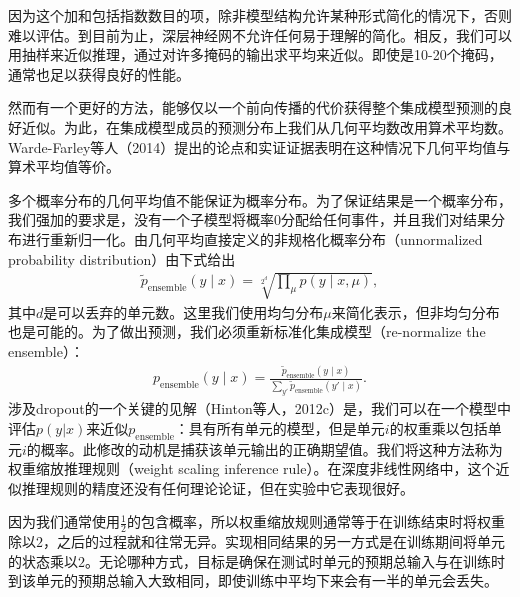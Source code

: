 因为这个加和包括指数数目的项，除非模型结构允许某种形式简化的情况下，否则难以评估。到目前为止，深层神经网不允许任何易于理解的简化。相反，我们可以用抽样来近似推理，通过对许多掩码的输出求平均来近似。即使是10-20个掩码，通常也足以获得良好的性能。

然而有一个更好的方法，能够仅以一个前向传播的代价获得整个集成模型预测的良好近似。为此，在集成模型成员的预测分布上我们从几何平均数改用算术平均数。Warde-Farley等人（2014）提出的论点和实证证据表明在这种情况下几何平均值与算术平均值等价。

多个概率分布的几何平均值不能保证为概率分布。为了保证结果是一个概率分布，我们强加的要求是，没有一个子模型将概率$0$分配给任何事件，并且我们对结果分布进行重新归一化。由几何平均直接定义的非规格化概率分布（unnormalized probability distribution）由下式给出
$$
\begin{aligned}
\tilde{p}_{\text{ensemble}}(y \mid x) = \sqrt[2^d]{\prod_{\mu} p(y \mid x, \mu)},
\end{aligned}
$$
其中$d$是可以丢弃的单元数。这里我们使用均匀分布$\mu$来简化表示，但非均匀分布也是可能的。为了做出预测，我们必须重新标准化集成模型（re-normalize the ensemble）：
$$
\begin{aligned}
p_{\text{ensemble}}(y \mid x) = \frac{\tilde{p}_{\text{ensemble}}(y \mid x)}
{\sum_{y'}\tilde{p}_{\text{ensemble}}(y' \mid x) }.
\end{aligned}
$$
涉及dropout的一个关键的见解（Hinton等人，2012c）是，我们可以在一个模型中评估$p(y|x)$来近似$p_{\text{ensemble}}$：具有所有单元的模型，但是单元$i$的权重乘以包括单元$i$的概率。此修改的动机是捕获该单元输出的正确期望值。我们将这种方法称为权重缩放推理规则（weight scaling inference rule）。在深度非线性网络中，这个近似推理规则的精度还没有任何理论论证，但在实验中它表现很好。

因为我们通常使用$\frac{1}{2}$的包含概率，所以权重缩放规则通常等于在训练结束时将权重除以$2$，之后的过程就和往常无异。实现相同结果的另一方式是在训练期间将单元的状态乘以$2$。无论哪种方式，目标是确保在测试时单元的预期总输入与在训练时到该单元的预期总输入大致相同，即使训练中平均下来会有一半的单元会丢失。

